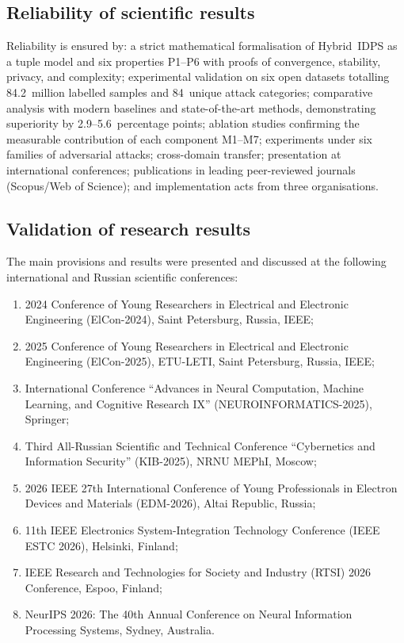 \documentclass[12pt,a5paper]{article}
\begin{document}
\subsection*{Reliability of scientific results}

Reliability is ensured by: a strict mathematical formalisation
of Hybrid~IDPS as a tuple model and six properties P1--P6 with
proofs of convergence, stability, privacy, and complexity;
experimental validation on six open datasets totalling
84.2~million labelled samples and 84~unique attack categories;
comparative analysis with modern baselines and state-of-the-art
methods, demonstrating superiority by 2.9--5.6~percentage
points; ablation studies confirming the measurable contribution
of each component M1--M7; experiments under six families of
adversarial attacks; cross-domain transfer; presentation at
international conferences; publications in leading peer-reviewed
journals (Scopus/Web of Science); and implementation acts from
three organisations.

\subsection*{Validation of research results}

The main provisions and results were presented and discussed at
the following international and Russian scientific conferences:

\begin{enumerate}
\item 2024 Conference of Young Researchers in Electrical and Electronic Engineering (ElCon-2024), Saint Petersburg, Russia, IEEE;
\item 2025 Conference of Young Researchers in Electrical and Electronic Engineering (ElCon-2025), ETU-LETI, Saint Petersburg, Russia, IEEE;
\item International Conference ``Advances in Neural Computation, Machine Learning, and Cognitive Research IX'' (NEUROINFORMATICS-2025), Springer;
\item Third All-Russian Scientific and Technical Conference ``Cybernetics and Information Security'' (KIB-2025), NRNU MEPhI, Moscow;
\item 2026 IEEE 27th International Conference of Young Professionals in Electron Devices and Materials (EDM-2026), Altai Republic, Russia;
\item 11th IEEE Electronics System-Integration Technology Conference (IEEE ESTC 2026), Helsinki, Finland;
\item IEEE Research and Technologies for Society and Industry (RTSI) 2026 Conference, Espoo, Finland;
\item NeurIPS 2026: The 40th Annual Conference on Neural Information Processing Systems, Sydney, Australia.
\end{enumerate}
\end{document}
